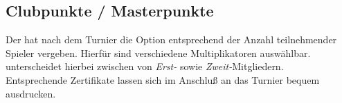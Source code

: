\subsection{Clubpunkte / Masterpunkte}

\noindent
Der \tl hat nach dem Turnier die Option \cps entsprechend der Anzahl teilnehmender
Spieler vergeben. Hierfür sind verschiedene \cp Multiplikatoren auswählbar.\\[.1cm]
\bb unterscheidet hierbei zwischen \cps von \textit{Erst-} sowie \textit{Zweit-}Mitgliedern.\\[.1cm]
Entsprechende Zertifikate lassen sich im Anschluß an das Turnier bequem ausdrucken.
